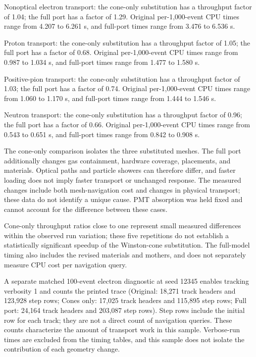 Nonoptical electron transport: the cone-only substitution has a throughput factor of 1.04; the full port has a
factor of 1.29. Original per-1,000-event CPU times range from 4.207 to 6.261 s, and full-port times range from
3.476 to 6.536 s.

Proton transport: the cone-only substitution has a throughput factor of 1.05; the full port has a factor of
0.68. Original per-1,000-event CPU times range from 0.987 to 1.034 s, and full-port times range from 1.477 to
1.580 s.

Positive-pion transport: the cone-only substitution has a throughput factor of 1.03; the full port has a factor
of 0.74. Original per-1,000-event CPU times range from 1.060 to 1.170 s, and full-port times range from 1.444
to 1.546 s.

Neutron transport: the cone-only substitution has a throughput factor of 0.96; the full port has a factor of
0.66. Original per-1,000-event CPU times range from 0.543 to 0.651 s, and full-port times range from 0.842 to
0.908 s.

The cone-only comparison isolates the three substituted meshes. The full port additionally changes gas
containment, hardware coverage, placements, and materials. Optical paths and particle showers can therefore
differ, and faster loading does not imply faster transport or unchanged response. The measured changes include
both mesh-navigation cost and changes in physical transport; these data do not identify a unique cause. PMT
absorption was held fixed and cannot account for the difference between these cases.

Cone-only throughput ratios close to one represent small measured differences within the observed run
variation; these five repetitions do not establish a statistically significant speedup of the Winston-cone
substitution. The full-model timing also includes the revised materials and mothers, and does not separately
measure CPU cost per navigation query.

A separate matched 100-event electron diagnostic at seed 12345 enables tracking verbosity 1 and counts the
printed trace (Original: 18,271 track headers and 123,928 step rows; Cones only: 17,025 track headers and
115,895 step rows; Full port: 24,164 track headers and 203,087 step rows). Step rows include the initial row
for each track; they are not a direct count of navigation queries. These counts characterize the amount of
transport work in this sample. Verbose-run times are excluded from the timing tables, and this sample does not
isolate the contribution of each geometry change.

